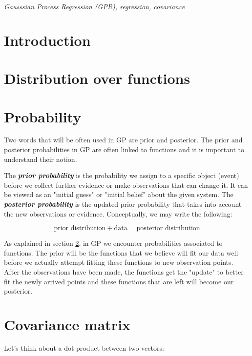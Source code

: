 \documentclass[10pt,twocolumn]{article}
\begin{document}
\textit{Gausssian Process Regression (GPR), regression, covariance}

\tableofcontents

\section{Introduction}




\section{Distribution over functions} \label{sec:dist_over_fun}



\section{Probability}

Two words that will be often used in GP are prior and posterior. The prior and posterior probabilities in GP are often linked to functions and it is important to understand their notion. 

The \textbf{\textit{prior probability}} is the probability we assign to a specific object (event) before we collect further evidence or make observations that can change it. It can be viewed as an "initial guess" or "initial belief" about the given system. The \textbf{\textit{posterior probability}} is the updated prior probability that takes into account the new observations or evidence. Conceptually, we may write the following:

\begin{equation}
\text{prior distribution} + \text{data} = \text{posterior distribution}
\end{equation}

As explained in section \ref{sec:dist_over_fun}, in GP we encounter probabilities associated to functions. The prior will be the functions that we believe will fit our data well before we actually attempt fitting these functions to new observation points. After the observations have been made, the functions get the "update" to better fit the newly arrived points and these functions that are left will become our posterior.


\section{Covariance matrix}

Let's think about a dot product between two vectors:
\end{document}
